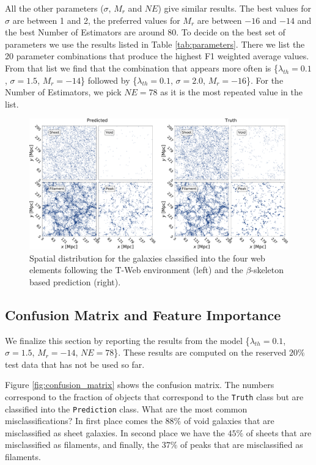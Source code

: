 \documentclass[usenatbib]{mnras}
\begin{document}
All the other parameters ($\sigma$, $M_r$ and $NE$) give similar results. 
The best values for $\sigma$ are between 1 and 2, the preferred values
for $M_r$ are between $-16$ and $-14$ and the best Number of
Estimators are around $80$.
To decide on the best set of parameters we use the results listed in
Table \ref{tab:parameters}.
There we list the 20 parameter combinations that
produce the highest F1 weighted average values.
From that list we find that the combination that appears more often is 
\{$\lambda_{th}=0.1$, $\sigma=1.5$, $M_r=-14$\} followed by 
\{$\lambda_{th}=0.1$, $\sigma=2.0$, $M_r=-16$\}.
For the Number of Estimators, we pick $NE=78$ as it is the most
repeated value in the list.

\begin{figure}
  \centering 
    \includegraphics[scale=0.28]{Figs/p_environment_predicted.pdf}
    \caption{Spatial distribution for the galaxies classified into the
      four web elements following the T-Web environment (left) and 
      the $\beta$-skeleton based prediction (right).} 
    \label{fig:prediction}
\end{figure}


\subsection{Confusion Matrix and Feature Importance}

We finalize this section by reporting the results from the model 
\{$\lambda_{th}=0.1$, $\sigma=1.5$, $M_r=-14$, $NE=78$\}.
These results are computed on the reserved $20\%$ test data that has not be used so far.

Figure \ref{fig:confusion_matrix} shows the confusion matrix.
The numbers correspond to the fraction of objects that correspond to
the \verb"Truth" class but are classified into the \verb"Prediction"
class.
What are the most common misclassifications?
In first place comes the $88\%$ of void galaxies that are misclassified
as sheet galaxies.  
In second place we have the $45\%$ of sheets that are misclassified
as filaments, and finally, the $37\%$ of peaks that are misclassified
as filaments.
\end{document}
